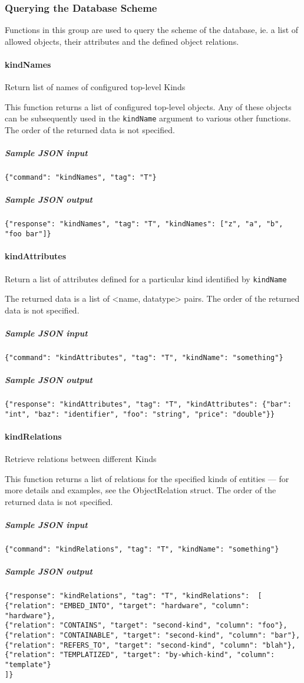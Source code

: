 \documentclass[deska]{subfiles}
\begin{document}
\newcommand{\deskaFunc}[5]
{\paragraph{#1}\label{sec:api-ref-#1}

{#4}

{#5}

\subparagraph{Sample JSON input} {\tt \{"command": "{#1}", "tag": "T"{#2}\}}

\subparagraph{Sample JSON output} {\tt \{"response": "{#1}", "tag": "T"\ifstrequal{#3}{}{}{, "{#1}": {#3}}\}}

}

\newcommand{\deskaUnsortedRes}{The order of the returned data is not specified.}

\setcounter{secnumdepth}{4}

\subsubsection{Querying the Database Scheme}
\label{sec:api-group-dbscheme}

Functions in this group are used to query the scheme of the database, ie. a list of allowed objects, their attributes
and the defined object relations.

\deskaFunc{kindNames}{}{["z", "a", "b", "foo bar"]}
    {Return list of names of configured top-level Kinds}
    {This function returns a list of configured top-level objects.  Any of these objects can be subsequently used in the
    {\tt kindName} argument to various other functions.  \deskaUnsortedRes}

\deskaFunc{kindAttributes}{, "kindName": "something"}
    {\{"bar": "int", "baz": "identifier", "foo": "string", "price": "double"\}}
    {Return a list of attributes defined for a particular kind identified by {\tt kindName}}
    {The returned data is a list of \textless name, datatype\textgreater { }pairs.  \deskaUnsortedRes}

\deskaFunc{kindRelations}{, "kindName": "something"}
    { [ \\
            \{"relation": "EMBED\_INTO", "target": "hardware", "column": "hardware"\}, \\
            \{"relation": "CONTAINS", "target": "second-kind", "column": "foo"\}, \\
            \{"relation": "CONTAINABLE", "target": "second-kind", "column": "bar"\}, \\
            \{"relation": "REFERS\_TO", "target": "second-kind", "column": "blah"\}, \\
            \{"relation": "TEMPLATIZED", "target": "by-which-kind", "column": "template"\} \\
            ]}
    {Retrieve relations between different Kinds}
    {This function returns a list of relations for the specified kinds of entities --- for more details and examples, see
    the ObjectRelation struct.  \deskaUnsortedRes}
\end{document}
